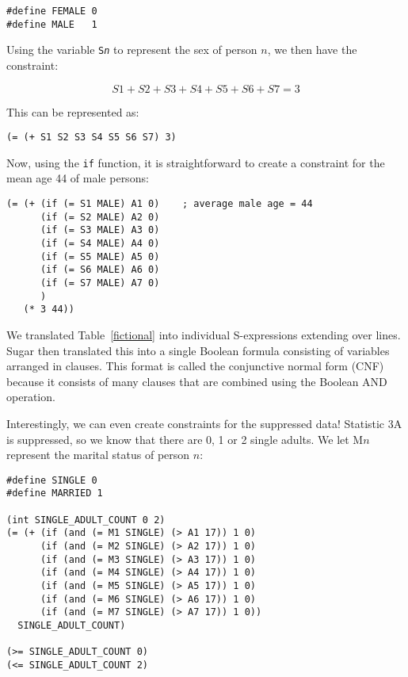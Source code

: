 \documentclass[runningheads]{llncs}
\begin{document}
\begin{Verbatim}
#define FEMALE 0
#define MALE   1
\end{Verbatim} 

Using the variable \texttt{S\emph{n}} to represent the sex of person
$n$, we then have the constraint:

\begin{equation}
S1 + S2 + S3 + S4 + S5 + S6 + S7 = 3
\end{equation}

This can be represented as:

\begin{Verbatim}
(= (+ S1 S2 S3 S4 S5 S6 S7) 3)
\end{Verbatim}

Now, using the \texttt{if} function, it is straightforward to create a constraint for
the mean age 44 of male persons:

\begin{Verbatim}
(= (+ (if (= S1 MALE) A1 0)    ; average male age = 44
      (if (= S2 MALE) A2 0)
      (if (= S3 MALE) A3 0)
      (if (= S4 MALE) A4 0)
      (if (= S5 MALE) A5 0)
      (if (= S6 MALE) A6 0)
      (if (= S7 MALE) A7 0)
      )
   (* 3 44))
\end{Verbatim}

We translated Table~\ref{fictional} into \NumSExpressions{} individual
S-expressions extending over \NumConstraintLines{} lines. Sugar then
translated this into a single Boolean formula consisting of
\NumVariables variables arranged in 
\NumClauses clauses. This format is called
the conjunctive normal form (CNF) because it consists of many
clauses that are combined using the Boolean AND operation.

Interestingly, we can even create constraints for the suppressed data!
Statistic 3A is suppressed, so we know that there are 0, 1 or 2 single
adults. We let $\textrm{M}n$ represent the marital status of person
$n$:

\begin{Verbatim}
#define SINGLE 0
#define MARRIED 1

(int SINGLE_ADULT_COUNT 0 2)
(= (+ (if (and (= M1 SINGLE) (> A1 17)) 1 0)
      (if (and (= M2 SINGLE) (> A2 17)) 1 0)      
      (if (and (= M3 SINGLE) (> A3 17)) 1 0)      
      (if (and (= M4 SINGLE) (> A4 17)) 1 0)      
      (if (and (= M5 SINGLE) (> A5 17)) 1 0)      
      (if (and (= M6 SINGLE) (> A6 17)) 1 0)      
      (if (and (= M7 SINGLE) (> A7 17)) 1 0))
  SINGLE_ADULT_COUNT)

(>= SINGLE_ADULT_COUNT 0)
(<= SINGLE_ADULT_COUNT 2)
\end{Verbatim}
\end{document}
